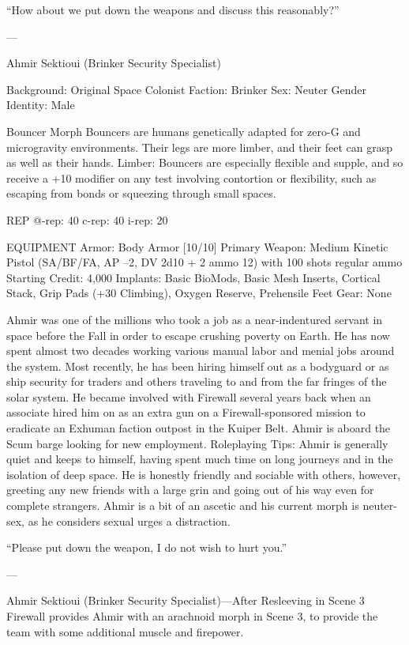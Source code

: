 “How about we put down the weapons and discuss this reasonably?”

---

Ahmir Sektioui (Brinker Security Specialist)

Background: Original Space Colonist
Faction: Brinker
Sex: Neuter
Gender Identity: Male

Bouncer Morph
Bouncers are humans genetically adapted for zero-G and microgravity environments. Their legs are more limber, and their feet can grasp as well as their hands.
Limber: Bouncers are especially flexible and supple, and so receive a +10 modifier on any test involving contortion or flexibility, such as escaping from bonds or squeezing through small spaces.

REP
@-rep:	40
c-rep:	40
i-rep:	20

EQUIPMENT
Armor: Body Armor [10/10]
Primary Weapon: Medium Kinetic Pistol (SA/BF/FA, AP –2, DV 2d10 + 2 ammo 12) with 100 shots regular ammo
Starting Credit: 4,000
Implants: Basic BioMods, Basic Mesh Inserts, Cortical Stack, Grip Pads (+30 Climbing), Oxygen Reserve, Prehensile Feet
Gear: None

Ahmir was one of the millions who took a job as a near-indentured servant in space before the Fall in order to escape crushing poverty on Earth. He has now spent almost two decades working various manual labor and menial jobs around the system. Most recently, he has been hiring himself out as a bodyguard or as ship security for traders and others traveling to and from the far fringes of the solar system. He became involved with Firewall several years back when an associate hired him on as an extra gun on a Firewall-sponsored mission to eradicate an Exhuman faction outpost in the Kuiper Belt. Ahmir is aboard the Scum barge looking for new employment.
Roleplaying Tips: Ahmir is generally quiet and keeps to himself, having spent much time on long journeys and in the isolation of deep space. He is honestly friendly and sociable with others, however, greeting any new friends with a large grin and going out of his way even for complete strangers. Ahmir is a bit of an ascetic and his current morph is neuter-sex, as he considers sexual urges a distraction.

“Please put down the weapon, I do not wish to hurt you.”

---

Ahmir Sektioui (Brinker Security Specialist)—After Resleeving in Scene 3
Firewall provides Ahmir with an arachnoid morph in Scene 3, to provide the team with some additional muscle and firepower.


